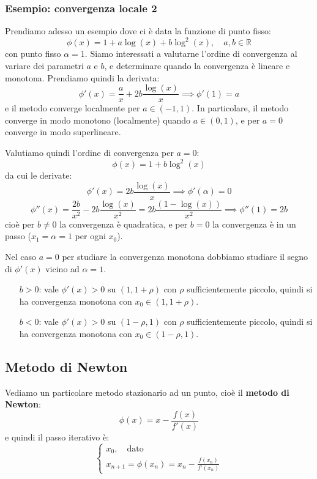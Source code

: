 \documentclass[a4paper,11pt]{article}
\begin{document}
\subsubsection{Esempio: convergenza locale 2}
Prendiamo adesso un esempio dove ci è data la funzione di punto fisso: 
$$
\phi(x) = 1 + a \log(x) + b \log^2(x), \quad a, b \in \mathbb{R}
$$
con punto fisso $\alpha = 1$.
Siamo interessati a valutarne l'ordine di convergenza al variare dei parametri $a$ e $b$, e determinare quando la convergenza è lineare e monotona.
Prendiamo quindi la derivata:
$$
\phi'(x) = \frac{a}{x} + 2b \frac{\log(x)}{x} \implies \phi'(1) = a
$$
e il metodo converge localmente per $a \in (-1, 1)$.
In particolare, il metodo converge in modo monotono (localmente) quando $a \in (0, 1)$, e per $a = 0$ converge in modo superlineare.

Valutiamo quindi l'ordine di convergenza per $a = 0$:
$$
\phi(x) = 1 + b \log^2(x)
$$
da cui le derivate:
$$
\phi'(x) = 2b \frac{\log(x)}{x} \implies \phi'(\alpha) = 0
$$
$$
\phi''(x) = \frac{2b}{x^2} - 2b \frac{\log(x)}{x^2} = 2b \frac{(1 - \log(x))}{x^2} \implies \phi''(1) = 2b
$$
cioè per $b \neq 0$ la convergenza è quadratica, e per $b = 0$ la convergenza è in un passo ($x_1 = \alpha = 1$ per ogni $x_0$).

Nel caso $a = 0$ per studiare la convergenza monotona dobbiamo studiare il segno di $\phi'(x)$ vicino ad $\alpha = 1$.
\begin{itemize}
	\item[$b > 0$:] vale $\phi'(x) > 0$ su $(1, 1 + \rho)$ con $\rho$ sufficientemente piccolo, quindi si ha convergenza monotona con $x_0 \in (1, 1 + \rho)$.
	\item[$b < 0$:] vale $\phi'(x) > 0$ su $(1 - \rho, 1)$ con $\rho$ sufficientemente piccolo, quindi si ha convergenza monotona con $x_0 \in (1 - \rho, 1)$.
\end{itemize}

\subsection{Metodo di Newton}
Vediamo un particolare metodo stazionario ad un punto, cioè il \textbf{metodo di Newton}:
$$
\phi(x) = x - \frac{f(x)}{f'(x)}
$$
e quindi il passo iterativo è:
\[
	\begin{cases}
		x_0, \quad \text{dato}	\\
		x_{n + 1} = \phi(x_n) =  x_n - \frac{f(x_n)}{f'(x_n)}
	\end{cases}
\]
\end{document}
